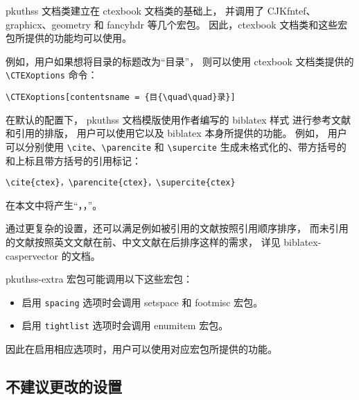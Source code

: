 		pkuthss 文档类建立在 ctexbook\supercite{ctex} 文档类的基础上，
		并调用了 CJKfntef、%
		graphicx\supercite{graphicx}、geometry\supercite{geometry} 和%
		fancyhdr\supercite{fancyhdr} 等几个宏包。
		因此，ctexbook 文档类和这些宏包所提供的功能均可以使用。

		例如，用户如果想将目录的标题改为“目{\quad\quad}录”，
		则可以使用 ctexbook 文档类提供的 \verb|\CTEXoptions| 命令：
\begin{Verbatim}[frame = single]
\CTEXoptions[contentsname = {目{\quad\quad}录}]
\end{Verbatim}

		在默认的配置下，%
		pkuthss 文档模版使用作者编写的 %
		biblatex\supercite{biblatex} 样式\supercite{biblatex-caspervector}%
		进行参考文献和引用的排版，
		用户可以使用它以及 biblatex 本身所提供的功能。
		例如，
		用户可以分别使用 \verb|\cite|、\verb|\parencite| 和 \verb|\supercite| %
		生成未格式化的、带方括号的和上标且带方括号的引用标记：
\begin{Verbatim}[frame = single]
\cite{ctex}，\parencite{ctex}，\supercite{ctex}
\end{Verbatim}
		在本文中将产生“\cite{ctex}，\parencite{ctex}，\supercite{ctex}”。

		通过更复杂的设置，还可以满足例如被引用的文献按照引用顺序排序，
		而未引用的文献按照英文文献在前、中文文献在后排序这样的需求，
		详见 biblatex-caspervector 的文档\supercite{biblatex-caspervector}。

		pkuthss-extra 宏包可能调用以下这些宏包：
		\begin{itemize}
			\item 启用 \verb|spacing| 选项时会调用 %
				setspace 和 footmisc\supercite{footmisc} 宏包。
			\item 启用 \verb|tightlist| 选项时会调用 %
				enumitem\supercite{enumitem} 宏包。
		\end{itemize}
		因此在启用相应选项时，用户可以使用对应宏包所提供的功能。

		\subsection{不建议更改的设置}

